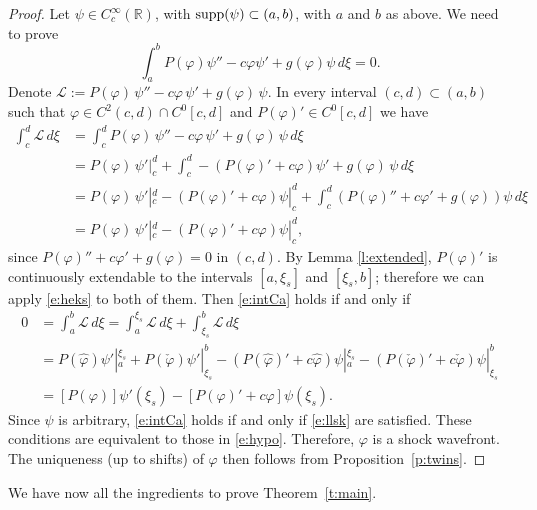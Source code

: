 \documentclass[11pt,a4paper]{article}
\renewcommand{\phi}{\varphi}
\begin{document}
\begin{proof}
Let $\psi \in C^\infty_c(\mathbb R)$, with ${\rm supp}(\psi)\subset (a,b)$, with $a$ and $b$ as above. We need to prove 
 \begin{equation}
 \label{e:intCa}
 \int_a^b P(\varphi)\psi''-c\varphi \psi' +g(\varphi)\psi\,d\xi = 0.
 \end{equation}
Denote $\mathcal L:= P(\varphi)\, \psi'' - c \varphi \,\psi' +g(\varphi)\,\psi$.
In every interval $(c,d)\subset(a,b)$ such that $\varphi \in C^2(c,d)\cap C^0[c,d]$ and $P(\varphi)' \in C^0[c,d]$  we have
\begin{align}
\int_c^d \mathcal L\,d\xi &= \int_c^d P(\varphi)\, \psi'' - c \varphi \,\psi' +g(\varphi)\,\psi\,d\xi
\nonumber
\\
&= P(\varphi)\,\psi'|^d_c + \int_c^d  -\left(P(\varphi)' +c\varphi\right)\psi' +g(\varphi)\,\psi\,d\xi 
\nonumber
\\
&= P(\varphi)\,\psi'|^d_c -\left(P(\varphi)'+c\varphi\right)\psi|^d_c+\int_c^d  \left(P(\varphi)''+c\varphi' +g(\varphi)\right)\psi\,d\xi
\nonumber
\\
&= P(\varphi)\,\psi'|^d_c -\left(P(\varphi)'+c\varphi\right)\psi|^d_c,
\label{e:heks}
\end{align}
since $P(\varphi)''+c\varphi' +g(\varphi)=0$ in $(c,d)$. By Lemma \ref{l:extended}, $P(\varphi)'$ is continuously extendable to the intervals $[a,\xi_s]$ and $[\xi_s,b]$; therefore we can apply \eqref{e:heks} to both of them. Then \eqref{e:intCa} holds if and only if
\begin{equation*}
\begin{aligned}
0&=\int_a^b \mathcal L \, d\xi  = \int_a^{\xi_s} \mathcal L \,d\xi+ \int_{\xi_s}^b \mathcal L\,d\xi
\\
&= P(\hat\varphi)\psi'|_a^{\xi_s} + P(\check\varphi)\psi'|_{\xi_s}^b
-\left(P(\hat\varphi)'+c\hat\varphi\right)\psi|_a^{\xi_s} - \left(P(\check\varphi)'+c\check\varphi\right)\psi|_{\xi_s}^b
\\
&=[P(\varphi)]\psi'(\xi_s)-\left[P(\varphi)'+c\varphi\right]\psi(\xi_s).
\end{aligned}
\end{equation*}
Since $\psi$ is arbitrary, \eqref{e:intCa} holds if and only if  \eqref{e:llsk} are satisfied. These conditions are equivalent to those in  \eqref{e:hypo}. Therefore, $\phi$ is a shock wavefront. The uniqueness (up to shifts) of $\phi$ then follows from Proposition~\ref{p:twins}.
\end{proof}

We have now all the ingredients to prove Theorem~\ref{t:main}.
\end{document}
